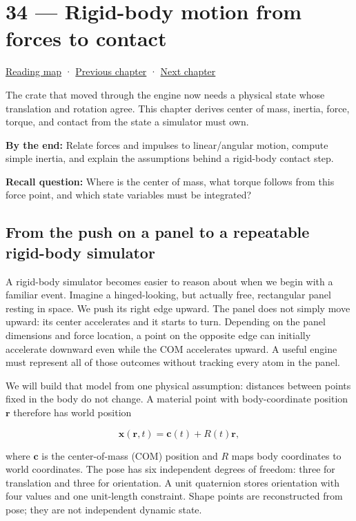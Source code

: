 \hypertarget{06-engine-ii-ch034}{}
\section{34 --- Rigid-body motion from forces to contact}\label{rigid-body-motion-from-forces-to-contact}

\href{Chapter\%20Edition/03\%20-\%20Game\%20Engine/00\%20-\%20Reading\%20Map}{Reading map} · \hyperref[06-engine-ii-ch033]{Previous chapter} · \hyperref[06-engine-ii-ch035]{Next chapter}

The crate that moved through the engine now needs a physical state whose translation and rotation agree. This chapter derives center of mass, inertia, force, torque, and contact from the state a simulator must own.

\textbf{By the end:} Relate forces and impulses to linear/angular motion, compute simple inertia, and explain the assumptions behind a rigid-body contact step.

\textbf{Recall question:} Where is the center of mass, what torque follows from this force point, and which state variables must be integrated?

\subsection{From the push on a panel to a repeatable rigid-body simulator}\label{from-the-push-on-a-panel-to-a-repeatable-rigid-body-simulator}

A rigid-body simulator becomes easier to reason about when we begin with a familiar event. Imagine a hinged-looking, but actually free, rectangular panel resting in space. We push its right edge upward. The panel does not simply move upward: its center accelerates and it starts to turn. Depending on the panel dimensions and force location, a point on the opposite edge can initially accelerate downward even while the COM accelerates upward. A useful engine must represent all of those outcomes without tracking every atom in the panel.

We will build that model from one physical assumption: distances between points fixed in the body do not change. A material point with body-coordinate position \(\mathbf r\) therefore has world position

\[
\mathbf x(\mathbf r,t)=\mathbf c(t)+R(t)\mathbf r,
\]

where \(\mathbf c\) is the center-of-mass (COM) position and \(R\) maps body coordinates to world coordinates. The pose has six independent degrees of freedom: three for translation and three for orientation. A unit quaternion stores orientation with four values and one unit-length constraint. Shape points are reconstructed from pose; they are not independent dynamic state.

